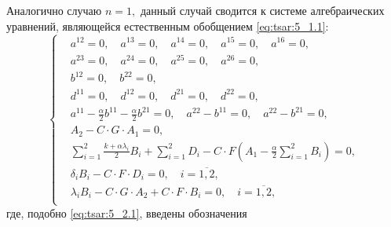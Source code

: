 Аналогично случаю $n=1,$ данный случай сводится к системе алгебраических 
уравнений, являющейся естественным обобщением \eqref{eq:tsar:5_1.1}:
\begin{equation}
\left\{
\begin{aligned}
&a^{12} =0, \quad
 a^{13} =0, \quad
 a^{14} =0, \quad
 a^{15} =0, \quad
 a^{16} =0, \\
&a^{23} =0, \quad
 a^{24} =0, \quad
 a^{25} =0, \quad
 a^{26} =0, \\
&b^{12} =0, \quad
 b^{22} =0, \\
&d^{11} =0, \quad
 d^{12} =0, \quad
 d^{21} =0, \quad
 d^{22} =0, \\
&
  a^{11} - \frac{\alpha}{2} b^{11} - \frac{\alpha}{2} b^{21} =0,\quad
  a^{22} - b^{11} =0, \quad
  a^{22} - b^{21} =0, \\
& A_2 - C \cdot G \cdot A_1 = 0,\\
& \sum_{i=1}^{2} \frac{ k + \alpha \lambda_i }{2} B_i 
  + \sum_{i=1}^{2} D_i
  - C \cdot F \left( A_1 - \frac{\alpha}{2} \sum_{i=1}^{2} B_i \right) = 0, \\
& \delta_i B_i- C \cdot F \cdot D_i =0, \quad i = \overline{ 1,2 },\\ 
& \lambda_i B_i - C \cdot G \cdot A_2 + C \cdot F \cdot B_i =0, \quad i = \overline{ 1,2 },\\
\end{aligned}
\right.
\label{eq:tsar:5_1.2}
\end{equation}
где, подобно \eqref{eq:tsar:5_2.1}, введены обозначения
